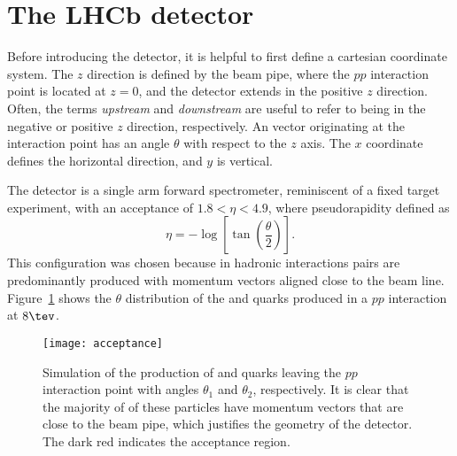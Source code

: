 \section{The LHCb detector}

Before introducing the \lhcb detector, it is helpful to first define a cartesian coordinate system.
The $z$ direction is defined by the \lhc beam pipe, where the $pp$ interaction point is located
at $z=0$, and the \lhcb detector extends in the positive $z$ direction.
Often, the terms \emph{upstream} and \emph{downstream} are useful to refer to being in the
negative or positive $z$ direction, respectively.
An vector originating at the interaction point has an angle $\theta$ with respect to the $z$ axis.
The $x$ coordinate defines the horizontal direction, and $y$ is vertical.

The \lhcb detector is a single arm forward spectrometer, reminiscent of a fixed target experiment,
with an acceptance of $1.8<\eta<4.9$, where pseudorapidity defined as
\begin{equation}
  \eta = -\log\left[\tan\left(\frac\theta2\right)\right].
\end{equation}
This configuration was chosen because in hadronic interactions \bbbar pairs are predominantly
produced with momentum vectors aligned close to the beam line.
Figure~\ref{fig:lhcb:bbbar} shows the $\theta$ distribution of the \bquark and \bquarkbar quarks
produced in a $pp$ interaction at $8\tev$.

\begin{figure}
  \begin{center}
    \texttt{[image: acceptance]}
  \end{center}
  \caption[Simulated production of $b\bquarkbar$ pairs and the LHCb acceptance]
  {\small
    Simulation of the production of \bquark and \protect\bquarkbar quarks leaving the $pp$
    interaction point with angles $\theta_1$ and $\theta_2$, respectively.
    It is clear that the majority of of these particles have momentum vectors that are close to the
    beam pipe, which justifies the geometry of the \lhcb detector.
    The dark red indicates the \lhcb acceptance region.
  }
  \label{fig:lhcb:bbbar}
\end{figure}






